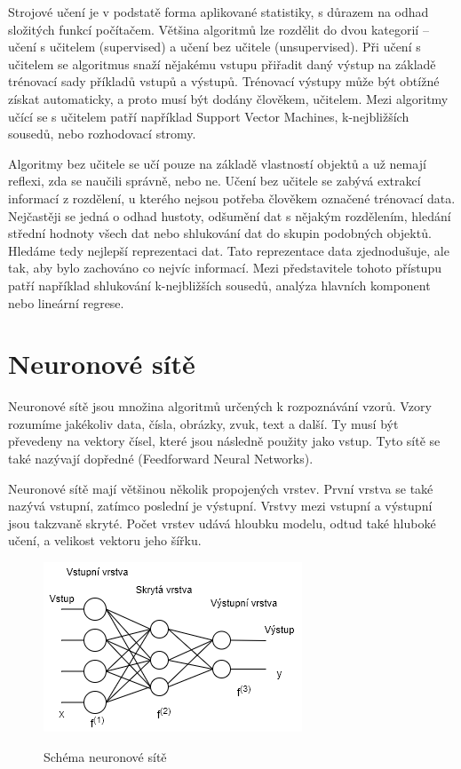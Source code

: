 Strojové učení je v podstatě forma aplikované statistiky,
s důrazem na odhad složitých funkcí počítačem.
Většina algoritmů lze rozdělit do dvou kategorií -- učení s učitelem (supervised) 
a učení bez učitele (unsupervised).
Při učení s učitelem se algoritmus snaží nějakému vstupu přiřadit daný výstup
na základě trénovací sady příkladů vstupů a výstupů.
Trénovací výstupy může být obtížné získat automaticky,
a proto musí být dodány člověkem, učitelem.
Mezi algoritmy učící se s učitelem patří například Support Vector Machines,
k-nejbližších sousedů, nebo rozhodovací stromy.
\cite{Goodfellow-et-al-2016}
\par

Algoritmy bez učitele se učí pouze na základě vlastností objektů 
a už nemají reflexi, zda se naučili správně, nebo ne.
Učení bez učitele se zabývá extrakcí informací z rozdělení,
u kterého nejsou potřeba člověkem označené trénovací data.
Nejčastěji se jedná o odhad hustoty, odšumění dat s nějakým rozdělením,
hledání střední hodnoty všech dat nebo shlukování dat do skupin podobných objektů.
Hledáme tedy nejlepší reprezentaci dat.
Tato reprezentace data zjednodušuje, ale tak, aby bylo zachováno co nejvíc informací.
Mezi představitele tohoto přístupu patří například shlukování k-nejbližších sousedů, 
analýza hlavních komponent nebo lineární regrese. 
\cite{Goodfellow-et-al-2016}

\section{Neuronové sítě}
Neuronové sítě jsou množina algoritmů určených k rozpoznávání vzorů.
Vzory rozumíme jakékoliv data, čísla, obrázky, zvuk, text a další.
Ty musí být převedeny na vektory čísel, 
které jsou následně použity jako vstup.
Tyto sítě se také nazývají dopředné (Feedforward Neural Networks).
\cite{Nicholson_NeuralNets}
\par

Neuronové sítě mají většinou několik propojených vrstev.
První vrstva se také nazývá vstupní, 
zatímco poslední je výstupní.
Vrstvy mezi vstupní a výstupní jsou takzvaně skryté.
Počet vrstev udává hloubku modelu, odtud také hluboké učení, 
a velikost vektoru jeho šířku.

\begin{figure}[h]\centering
    \centering
    \includegraphics[width=0.6\linewidth]{obrazky/NNSchema.png}\\[1pt]  
    \caption{Schéma neuronové sítě}    
    \label{obrazekSchemaNeuronoveSite}
\end{figure}

